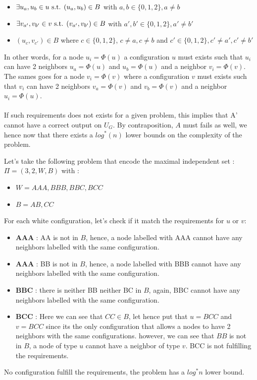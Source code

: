 \begin{itemize}
    \item $\exists u_a,u_b \in u \hbox{ s.t. } (u_a,u_b)\in B$ with $a,b\in \{0,1,2\}, a\neq b$
    \item $\exists v_{a'},v_{b'} \in v \hbox{ s.t. } (v_{a'},v_{b'})\in B$ with $a',b'\in \{0,1,2\}, a'\neq b'$
    \item $(u_c,v_{c'})\in B$ where $c \in \{0,1,2\}$, $c\neq a, c\neq b$ and $c' \in \{0,1,2\}, c'\neq a', c'\neq b'$
\end{itemize}
In other words, for a node $u_i = \Phi(u)$ a configuration $u$ must exists such that $u_i$ can have 2 neighbors $u_a = \Phi(u)$ and $u_b = \Phi(u)$ and a neighbor $v_i = \Phi(v)$.
The sames goes for a node $v_i = \Phi(v)$ where a configuration $v$ must exists such that $v_i$ can have 2 neighbors $v_a = \Phi(v)$ and $v_b = \Phi(v)$ and a neighbor $u_i = \Phi(u)$.\\\\
If such requirements does not exists for a given problem, this implies that A' cannot have a correct output on $U_G$. By contraposition, $A$ must fails as well, we hence now that there exists a $log^*(n)$ lower bounds on the complexity of the problem.
\begin{exmp}
Let's take the following problem that encode the maximal independent set : $\Pi=(3,2,W,B)$ with :
\begin{itemize}
    \item $W = AAA, BBB, BBC, BCC$
    \item $B = AB, CC$
\end{itemize}
For each white configuration, let's check if it match the requirements for $u$ or $v$:
\begin{itemize}
    \item \textbf{AAA} : AA is not in $B$, hence, a node labelled with AAA cannot have any neighbors labelled with the same configuration.
    \item \textbf{AAA} : BB is not in $B$, hence, a node labelled with BBB cannot have any neighbors labelled with the same configuration.
    \item \textbf{BBC} : there is neither BB neither BC in $B$, again, BBC cannot have any neighbors labelled with the same configuration.
    \item \textbf{BCC} : Here we can see that $CC\in B$, let hence put that $u = BCC$ and $v = BCC$ since its the only configuration that allows a nodes to have 2 neighbors with the same configurations. however, we can see that $BB$ is not in $B$, a node of type $u$ cannot have a neighbor of type $v$. BCC is not fulfilling the requirements.
\end{itemize}
No configuration fulfill the requirements, the problem has a $log^*n$ lower bound.
\end{exmp}
